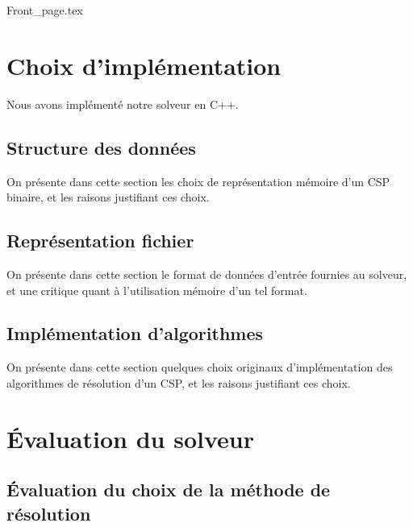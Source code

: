 \documentclass[14pt]{article}
\begin{document}
\renewcommand{\footrulewidth}{0.4pt}
\renewcommand{\headrulewidth}{0.4pt}

\vspace{0cm}              %


{Front_page.tex}

\clearpage
\thispagestyle{fancy}
\tableofcontents
\thispagestyle{fancy}      %

\clearpage

\section{Choix d'implémentation}

Nous avons implémenté notre solveur en C++.

\subsection{Structure des données}

On présente dans cette section les choix de représentation mémoire d'un CSP binaire, et les raisons justifiant ces choix.

\subsection{Représentation fichier}

On présente dans cette section le format de données d'entrée fournies au solveur, et une critique quant à l'utilisation mémoire d'un tel format.

\subsection{Implémentation d'algorithmes}

On présente dans cette section quelques choix originaux d'implémentation des algorithmes de résolution d'un CSP, et les raisons justifiant ces choix.

\section{Évaluation du solveur}

\subsection{Évaluation du choix de la méthode de résolution}
\end{document}
